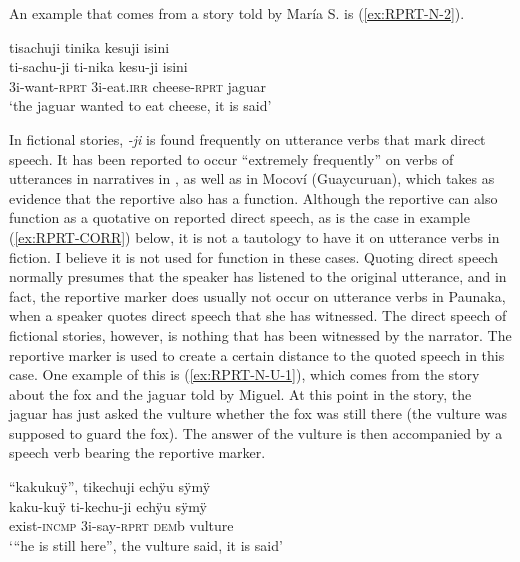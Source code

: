An example that comes from a story told by María S. is (\ref{ex:RPRT-N-2}).

\ea\label{ex:RPRT-N-2}
\begingl 
\glpreamble tisachuji tinika kesuji isini\\
\gla ti-sachu-ji ti-nika kesu-ji isini\\ 
\glb 3i-want-\textsc{rprt} 3i-eat.\textsc{irr} cheese-\textsc{rprt} jaguar\\ 
\glft ‘the jaguar wanted to eat cheese, it is said’\\ 
\endgl
\trailingcitation{[rxx-n120511l-1.025]}
\xe


In fictional stories, \textit{-ji} is found frequently on utterance verbs that mark direct speech. It has been reported to occur “extremely frequently” on verbs of utterances in narratives in  \citep[377]{Danielsen2007}, as well as in Mocoví (Guaycuruan), which \citet[218]{Mueller2013} takes as evidence that the reportive also has a  function. Although the reportive can also function as a quotative on reported direct speech, as is the case in example (\ref{ex:RPRT-CORR}) below, it is not a tautology to have it on utterance verbs in fiction. I believe it is not used for  function in these cases. Quoting direct speech normally presumes that the speaker has listened to the original utterance, and in fact, the reportive marker does usually not occur on utterance verbs in Paunaka, when a speaker quotes direct speech that she has witnessed. The direct speech of fictional stories, however, is nothing that has been witnessed by the narrator. The reportive marker is used to create a certain distance to the quoted speech in this case. One example of this is (\ref{ex:RPRT-N-U-1}), which comes from the story about the fox and the jaguar told by Miguel. At this point in the story, the jaguar has just asked the vulture whether the fox was still there (the vulture was supposed to guard the fox). The answer of the vulture is then accompanied by a speech verb bearing the reportive marker.

\ea\label{ex:RPRT-N-U-1}
\begingl 
\glpreamble “kakukuÿ”, tikechuji echÿu sÿmÿ\\
\gla kaku-kuÿ ti-kechu-ji echÿu sÿmÿ \\ 
\glb exist-\textsc{incmp} 3i-say-\textsc{rprt} \textsc{dem}b vulture \\ 
\glft ‘“he is still here”, the vulture said, it is said’
\endgl
\trailingcitation{[jmx-n120429ls-x5.157]}
\xe


